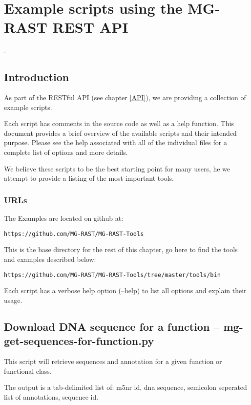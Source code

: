 
\chapter{Example scripts using the MG-RAST REST API}
\label{API-Examples}. %


\section{Introduction}
As part of the RESTful API (see chapter \ref{API}), we are providing a collection of example scripts. 

Each script has comments in the source code as well as a help function. This document provides a brief overview of the available scripts and their intended purpose.  Please see the help associated with all of the individual files for a complete list of options and more details.

We believe these scripts to be the best starting point for many users, he we attempt to provide a listing of the most important tools.


\subsection{URLs}
The Examples are located on github at:
\begin{small}
\begin{verbatim}
https://github.com/MG-RAST/MG-RAST-Tools
\end{verbatim}
This is the base directory for the rest of this chapter, go here to find the tools and examples described below:
\begin{verbatim}
https://github.com/MG-RAST/MG-RAST-Tools/tree/master/tools/bin
\end{verbatim}
Each script has a verbose help option (--help) to list all options and explain their usage.
\end{small}

\section{Download DNA sequence for a function -- mg-get-sequences-for-function.py}

This script will retrieve sequences and annotation for a given function or functional class.

The output is a tab-delimited list of: m5nr id, dna sequence, semicolon seperated list of annotations, sequence id.

